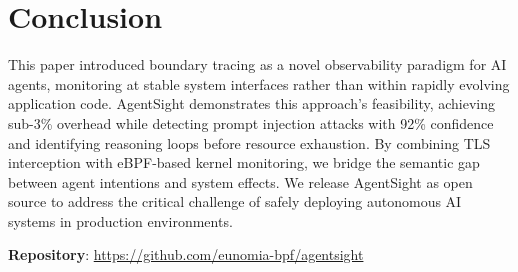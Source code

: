 \section{Conclusion}

This paper introduced boundary tracing as a novel observability paradigm for AI agents, monitoring at stable system interfaces rather than within rapidly evolving application code. AgentSight demonstrates this approach's feasibility, achieving sub-3\% overhead while detecting prompt injection attacks with 92\% confidence and identifying reasoning loops before resource exhaustion. By combining TLS interception with eBPF-based kernel monitoring, we bridge the semantic gap between agent intentions and system effects. We release AgentSight as open source to address the critical challenge of safely deploying autonomous AI systems in production environments.

\textbf{Repository}: \url{https://github.com/eunomia-bpf/agentsight}




